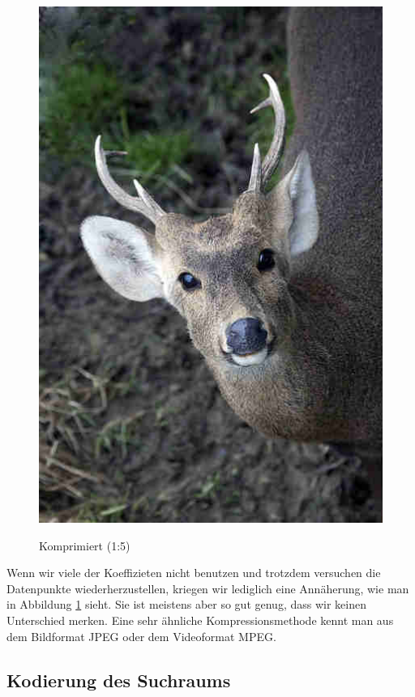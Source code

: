 \begin{multicols}{2}
\begin{figure}[H]
\begin{center}
                    \includegraphics[scale=0.239]{../pictures/gazelle-compressed.jpg}\\
                    \caption{Komprimiert (1:5)}\label{fig:gazelle-compressed}
                \end{center}
            \end{figure}
        \end{multicols}

        \noindent
        Wenn wir viele der Koeffizieten nicht benutzen und trotzdem versuchen die Datenpunkte wiederherzustellen, kriegen wir lediglich eine Annäherung, wie man in Abbildung \ref{fig:gazelle-compressed} sieht. Sie ist meistens aber so gut genug, dass wir keinen Unterschied merken. Eine sehr ähnliche Kompressionsmethode kennt man aus dem Bildformat JPEG oder dem Videoformat MPEG.

        \subsection{Kodierung des Suchraums}

